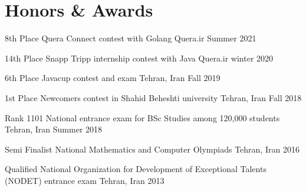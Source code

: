 \section{Honors \& Awards}

\cventry%
  {8th Place}
  {Quera Connect contest with Golang}
  {Quera.ir}{}
  {Summer 2021}{}

\cventry%
  {14th Place}
  {Snapp Tripp internship contest with Java}
  {Quera.ir}{}
  {winter 2020}{}

\cventry%
  {6th Place}
  {Javacup contest and exam}
  {Tehran, Iran}{}
  {Fall 2019}{}

\cventry%
  {1st Place}
  {Newcomers contest in Shahid Beheshti university}
  {Tehran, Iran}{}
  {Fall 2018}{}

\cventry%
  {Rank 1101}
  {National entrance exam for BSc Studies among 120,000 students}
  {Tehran, Iran}{}
  {Summer 2018}{}

\cventry%
  {Semi Finalist}
  {National Mathematics and Computer Olympiads}
  {Tehran, Iran}{}
  {2016}{}

\cventry%
  {Qualified}
  {National Organization for Development of Exceptional Talents (NODET) entrance exam}
  {Tehran, Iran}{}
  {2013}{}


